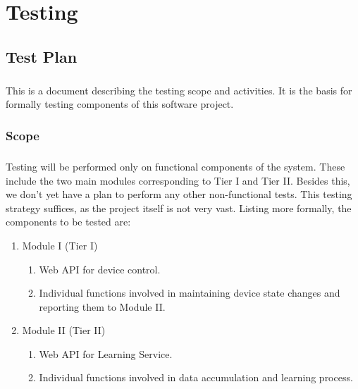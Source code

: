 \chapter{Testing}


\section{Test Plan}
\paragraph{}
This is a document describing the testing scope and activities. It is the basis for formally testing components of this software project.

\subsection{Scope}
\paragraph{}
Testing will be performed only on functional components of the system. These include the two main modules corresponding to Tier I and Tier II. Besides this, we don't yet have a plan to perform any other non-functional tests. This testing strategy suffices, as the project itself is not very vast. Listing more formally, the components to be tested are:
\begin{enumerate}
\item Module I (Tier I)
	\begin{enumerate}
	\item Web API for device control.
	\item Individual functions involved in maintaining device state changes and reporting them to Module II.
	\end{enumerate}
\item Module II (Tier II)
	\begin{enumerate}
	\item Web API for Learning Service.
	\item Individual functions involved in data accumulation and learning process.
	\end{enumerate}
\end{enumerate}

